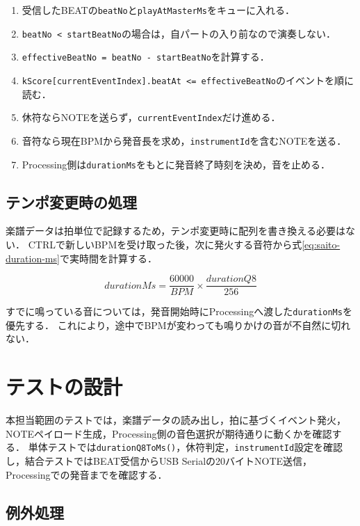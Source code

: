 \documentclass[lualatex,book,paper=a4paper,jafontsize=11.5pt,jafontscale=1.05]{jlreq}
\newcommand{\code}[1]{\texttt{#1}}
\begin{document}
\begin{enumerate}
  \item 受信したBEATの\code{beatNo}と\code{playAtMasterMs}をキューに入れる．
  \item \code{beatNo < startBeatNo}の場合は，自パートの入り前なので演奏しない．
  \item \code{effectiveBeatNo = beatNo - startBeatNo}を計算する．
  \item \code{kScore[currentEventIndex].beatAt <= effectiveBeatNo}のイベントを順に読む．
  \item 休符ならNOTEを送らず，\code{currentEventIndex}だけ進める．
  \item 音符なら現在BPMから発音長を求め，\code{instrumentId}を含むNOTEを送る．
  \item Processing側は\code{durationMs}をもとに発音終了時刻を決め，音を止める．
\end{enumerate}

\subsection{テンポ変更時の処理}

楽譜データは拍単位で記録するため，テンポ変更時に配列を書き換える必要はない．
CTRLで新しいBPMを受け取った後，次に発火する音符から式\ref{eq:saito-duration-ms}で実時間を計算する．

\begin{equation}
\label{eq:saito-duration-ms}
durationMs = \frac{60000}{BPM} \times \frac{durationQ8}{256}
\end{equation}

すでに鳴っている音については，発音開始時にProcessingへ渡した\code{durationMs}を優先する．
これにより，途中でBPMが変わっても鳴りかけの音が不自然に切れない．

\section{テストの設計}

本担当範囲のテストでは，楽譜データの読み出し，拍に基づくイベント発火，NOTEペイロード生成，Processing側の音色選択が期待通りに動くかを確認する．
単体テストでは\code{durationQ8ToMs()}，休符判定，\code{instrumentId}設定を確認し，結合テストではBEAT受信からUSB Serialの20バイトNOTE送信，Processingでの発音までを確認する．

\subsection{例外処理}
\end{document}
